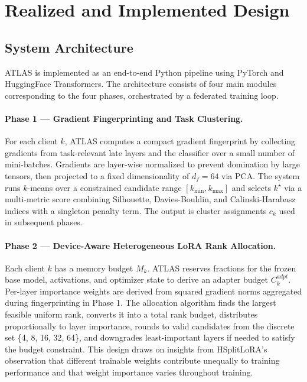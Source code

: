 \documentclass[11pt,a4paper]{article}
\begin{document}
\section{Realized and Implemented Design}

\subsection{System Architecture}

ATLAS is implemented as an end-to-end Python pipeline using PyTorch and HuggingFace Transformers. The architecture consists of four main modules corresponding to the four phases, orchestrated by a federated training loop.

\paragraph{Phase 1 --- Gradient Fingerprinting and Task Clustering.}
For each client $k$, ATLAS computes a compact gradient fingerprint by collecting gradients from task-relevant late layers and the classifier over a small number of mini-batches. Gradients are layer-wise normalized to prevent domination by large tensors, then projected to a fixed dimensionality of $d_f = 64$ via PCA. The system runs $k$-means over a constrained candidate range $[k_{\min}, k_{\max}]$ and selects $k^\star$ via a multi-metric score combining Silhouette, Davies-Bouldin, and Calinski-Harabasz indices with a singleton penalty term. The output is cluster assignments $c_k$ used in subsequent phases.

\paragraph{Phase 2 --- Device-Aware Heterogeneous LoRA Rank Allocation.}
Each client $k$ has a memory budget $M_k$. ATLAS reserves fractions for the frozen base model, activations, and optimizer state to derive an adapter budget $C_k^{adpt}$. Per-layer importance weights are derived from squared gradient norms aggregated during fingerprinting in Phase 1. The allocation algorithm finds the largest feasible uniform rank, converts it into a total rank budget, distributes proportionally to layer importance, rounds to valid candidates from the discrete set \{4, 8, 16, 32, 64\}, and downgrades least-important layers if needed to satisfy the budget constraint. This design draws on insights from HSplitLoRA's observation that different trainable weights contribute unequally to training performance and that weight importance varies throughout training.
\end{document}
